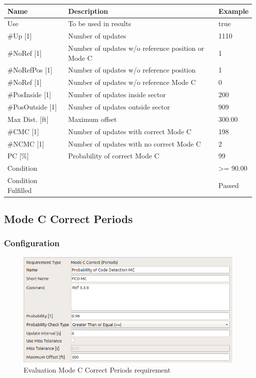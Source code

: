 \begin{center}
 \begin{table}[H]
  \begin{tabularx}{\textwidth}{ | l | X |  l | }
    \hline
    \textbf{Name} & \textbf{Description} & \textbf{Example} \\ \hline
    Use & To be used in results & true \\ \hline
    \#Up [1] & Number of updates & 1110 \\ \hline
    \#NoRef [1] & Number of updates w/o reference position or Mode C & 1 \\ \hline
    \#NoRefPos [1] & Number of updates w/o reference position  & 1 \\ \hline
    \#NoRef [1] & Number of updates w/o reference Mode C & 0 \\ \hline
    \#PosInside [1] & Number of updates inside sector & 200 \\ \hline
    \#PosOutside [1] & Number of updates outside sector & 909 \\ \hline
    Max Dist. [ft] & Maximum offset & 300.00 \\ \hline
    \#CMC [1] & Number of updates with correct Mode C & 198 \\ \hline
    \#NCMC [1] & Number of updates with no correct Mode C & 2 \\ \hline
    PC [\%] & Probability of correct Mode C & 99 \\ \hline
    Condition &  & >= 90.00 \\ \hline
    Condition Fulfilled &  & Passed \\ \hline
\end{tabularx}
\end{table}
\end{center}

\subsection{Mode C Correct Periods}
\label{sec:eval_req_mc_correct_periods} 

\subsubsection{Configuration}

\begin{figure}[H]
    \includegraphics[width=14cm,frame]{figures/eval_req_mc_correct_periods.png}
  \caption{Evaluation Mode C Correct Periods requirement}
\end{figure}

